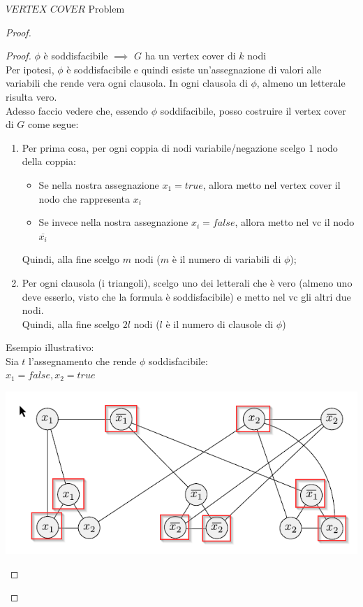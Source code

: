 \documentclass{article}  %
\theoremstyle{definition}
\begin{document}
\begin{theorem}{$VERTEX$ $COVER$ Problem}
\begin{proof}
\begin{itemize}
			      \begin{proof}
				      $\phi$ è soddisfacibile $\implies$ $G$ ha un vertex cover di $k$ nodi \\
				      Per ipotesi, $\phi$ è soddisfacibile e quindi esiste un'assegnazione di valori
				      alle variabili che rende vera ogni clausola.
				      In ogni clausola di $\phi$, almeno un letterale risulta vero. \\
				      Adesso faccio vedere che, essendo $\phi$ soddifacibile, posso costruire il vertex cover di $G$ come segue:
				      \begin{enumerate}
					      \item Per prima cosa, per ogni coppia di nodi variabile/negazione scelgo 1 nodo della coppia:
					            \begin{itemize}
						            \item Se nella nostra assegnazione $x_1=true$, allora metto nel vertex cover il nodo che rappresenta $x_i$
						            \item Se invece nella nostra assegnazione $x_i=false$, allora metto nel vc il nodo $\overline{x_i}$
					            \end{itemize}
					            Quindi, alla fine scelgo $m$ nodi ($m$ è il numero di variabili di $\phi$);
					      \item Per ogni clausola (i triangoli), scelgo uno dei letterali che è vero (almeno uno deve esserlo, visto che
					            la formula è soddisfacibile) e metto nel vc gli altri due nodi. \\
					            Quindi, alla fine scelgo $2l$ nodi ($l$ è il numero di clausole di $\phi$)
				      \end{enumerate}
				      Esempio illustrativo: \\
				      Sia $t$ l'assegnamento che rende $\phi$ soddisfacibile: \\
				      $x_1= false, x_2= true$
				      \begin{center}
					      \includegraphics[width=0.8\linewidth]{vc-example.png}

\end{center}
\end{proof}
\end{itemize}
\end{proof}
\end{theorem}
\end{document}
